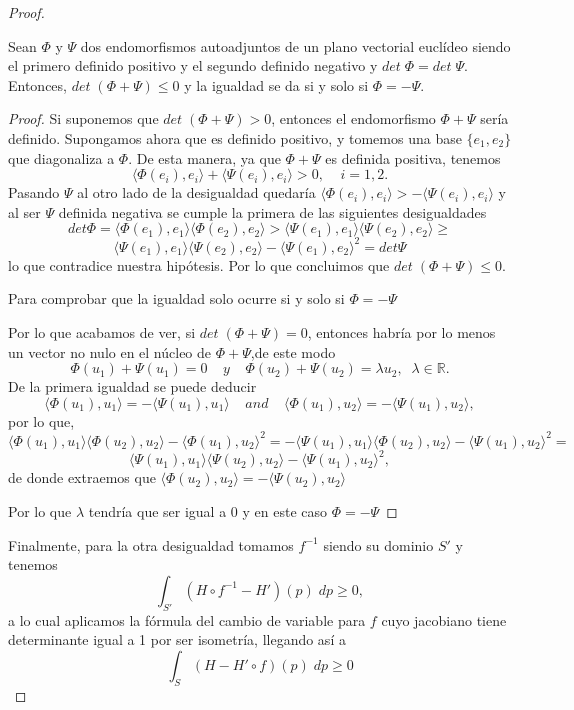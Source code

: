 \begin{proof}
	\begin{lema} \label{lem:lema2}
		Sean $\Phi$ y $\Psi$ dos endomorfismos autoadjuntos de un plano vectorial euclídeo siendo el primero definido positivo y el segundo definido negativo y $det \; \Phi = det \; \Psi$. Entonces, $det \; (\Phi + \Psi) \leq 0$ y la igualdad se da si y solo si $\Phi = - \Psi$.
	\end{lema}
	\begin{proof}
		Si suponemos que $det \; (\Phi + \Psi) > 0$, entonces el endomorfismo $\Phi + \Psi$ sería definido. Supongamos ahora que es definido positivo, y tomemos una base $\{ e_1, e_2 \}$ que diagonaliza a $\Phi$. De esta manera, ya que $\Phi + \Psi$ es definida positiva, tenemos
		\[
				\langle \Phi(e_i), e_i \rangle + \langle \Psi(e_i), e_i \rangle > 0, \;\;\;\; i = 1, 2.
		\]
		Pasando $\Psi$ al otro lado de la desigualdad quedaría $\langle \Phi(e_i), e_i \rangle  > -\langle \Psi(e_i), e_i \rangle$ y al ser $\Psi$ definida negativa se cumple la primera de las siguientes desigualdades
		$$
			det \Phi = \langle \Phi(e_1), e_1 \rangle \langle \Phi(e_2), e_2 \rangle > \langle \Psi(e_1), e_1 \rangle \langle \Psi(e_2), e_2 \rangle \geq $$
			$$ \langle \Psi(e_1), e_1 \rangle \langle \Psi(e_2), e_2 \rangle - \langle \Psi(e_1), e_2 \rangle^2 = det \Psi
		$$
		lo que contradice nuestra hipótesis. Por lo que concluimos que $ det \; (\Phi + \Psi) \leq 0$.
		
		Para comprobar que la igualdad solo ocurre si y solo si $\Phi = -\Psi$
		
		Por lo que acabamos de ver, si $det \; (\Phi + \Psi) = 0$, entonces habría por lo menos un vector no nulo en el núcleo de $\Phi + \Psi$,de este modo
		\[
			\Phi(u_1) + \Psi(u_1) = 0 \;\;\;\; y \;\;\;\; \Phi(u_2) + \Psi(u_2) = \lambda u_2, \;\; \lambda \in \mathbb{R}.
		\]
		De la primera igualdad se puede deducir
		$$ \langle \Phi(u_1), u_1 \rangle = - \langle \Psi(u_1), u_1 \rangle \;\;\;\; and \;\;\;\; \langle \Phi(u_1), u_2 \rangle = - \langle \Psi(u_1), u_2 \rangle, $$
		por lo que,
		$$ \langle \Phi(u_1),u_1\rangle \langle \Phi(u_2),u_2\rangle - \langle \Phi(u_1),u_2\rangle^2 =  -\langle \Psi(u_1),u_1\rangle \langle \Phi(u_2),u_2\rangle - \langle \Psi(u_1),u_2\rangle^2 = $$ $$ \langle \Psi(u_1),u_1\rangle \langle \Psi(u_2),u_2\rangle -\langle \Psi(u_1),u_2\rangle^2, $$
		de donde extraemos que $ \langle \Phi(u_2),u_2\rangle = -\langle \Psi(u_2),u_2\rangle $
		
		Por lo que $\lambda$ tendría que ser igual a $0$ y en este caso $\Phi = -\Psi$
		
	\end{proof}
	
	Finalmente, para la otra desigualdad tomamos $f^{-1}$ siendo su dominio $S'$ y tenemos
	\[
		\int_{S'} (H \circ f^{-1} - H')(p) \; dp \geq 0,
	\]
	a lo cual aplicamos la fórmula del cambio de variable para $f$ cuyo jacobiano tiene determinante igual a 1 por ser isometría, llegando así a
	\[
		\int_S (H - H' \circ f) (p) \; dp \geq 0
	\]
\end{proof}